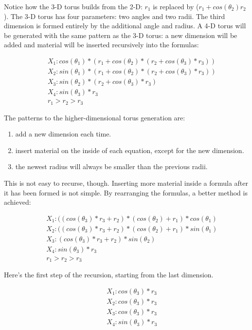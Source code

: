 Notice how the 3-D torus builds from the 2-D: $r_1$ is replaced by
($r_1 + cos(\theta_2)r_2$). The 3-D torus has four parameters: two angles and
two radii. The third dimension is formed entirely by the additional
angle and radius.  A 4-D torus will be generated with the same pattern
as the 3-D torus: a new dimension will be added and material will be
inserted recursively into the formulas:

\begin{eqnarray*}
&&X_1: cos(\theta_1) * (r_1 + cos(\theta_2) * (r_2 + cos(\theta_3) * r_3))\\
&&X_2: sin(\theta_1) * (r_1 + cos(\theta_2) * (r_2 + cos(\theta_3) * r_3))\\
&&X_3: sin(\theta_2) * (r_2 + cos(\theta_3) * r_3)\\
&&X_4: sin(\theta_3) * r_3\\
&&r_1 > r_2 > r_3
\end{eqnarray*}

The patterns to the higher-dimensional torus generation are:

\begin{enumerate} \itemsep 0in
\item add a new dimension each time.
\item insert material on the inside of each equation, except for the
  new dimension.
\item the newest radius will always be smaller than the previous radii.
\end{enumerate}

This is not easy to recurse, though. Inserting more material inside a
formula after it has been formed is not simple. By rearranging the
formulas, a better method is achieved:

\begin{eqnarray*}
&&X_1: ((cos(\theta_3) * r_3 + r_2) * (cos(\theta_2) + r_1) * cos(\theta_1)\\
&&X_2: ((cos(\theta_3) * r_3 + r_2) * (cos(\theta_2) + r_1) * sin(\theta_1)\\
&&X_3:  (cos(\theta_3) * r_3 + r_2) * sin(\theta_2)\\
&&X_4:   sin(\theta_3) * r_3\\
&&r_1 > r_2 > r_3
\end{eqnarray*}

Here's the first step of the recursion, starting from the last
dimension.

\begin{eqnarray*}
&&X_1: cos(\theta_3) * r_3\\
&&X_2: cos(\theta_3) * r_3\\
&&X_3: cos(\theta_3) * r_3\\
&&X_4: sin(\theta_3) * r_3
\end{eqnarray*}

